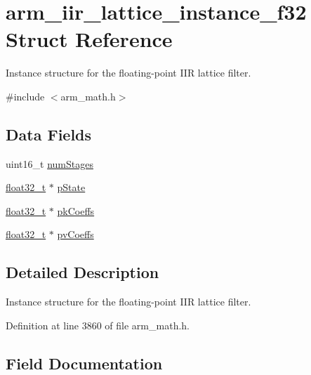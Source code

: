 \hypertarget{structarm__iir__lattice__instance__f32}{}\section{arm\+\_\+iir\+\_\+lattice\+\_\+instance\+\_\+f32 Struct Reference}
\label{structarm__iir__lattice__instance__f32}


Instance structure for the floating-\/point I\+IR lattice filter.  




{\ttfamily \#include $<$arm\+\_\+math.\+h$>$}

\subsection*{Data Fields}
\begin{DoxyCompactItemize}
\item 
uint16\+\_\+t \hyperlink{structarm__iir__lattice__instance__f32_a4cceb90547b3e585d4c7aabaa8057212}{num\+Stages}
\item 
\hyperlink{arm__math_8h_a4611b605e45ab401f02cab15c5e38715}{float32\+\_\+t} $\ast$ \hyperlink{structarm__iir__lattice__instance__f32_a335c87e6fdc4b96601d95a5de8b9c463}{p\+State}
\item 
\hyperlink{arm__math_8h_a4611b605e45ab401f02cab15c5e38715}{float32\+\_\+t} $\ast$ \hyperlink{structarm__iir__lattice__instance__f32_a994889c5c4a866c50a0ee63326378816}{pk\+Coeffs}
\item 
\hyperlink{arm__math_8h_a4611b605e45ab401f02cab15c5e38715}{float32\+\_\+t} $\ast$ \hyperlink{structarm__iir__lattice__instance__f32_a0f8815744fade9c580d44277ff802308}{pv\+Coeffs}
\end{DoxyCompactItemize}


\subsection{Detailed Description}
Instance structure for the floating-\/point I\+IR lattice filter. 

Definition at line 3860 of file arm\+\_\+math.\+h.



\subsection{Field Documentation}
